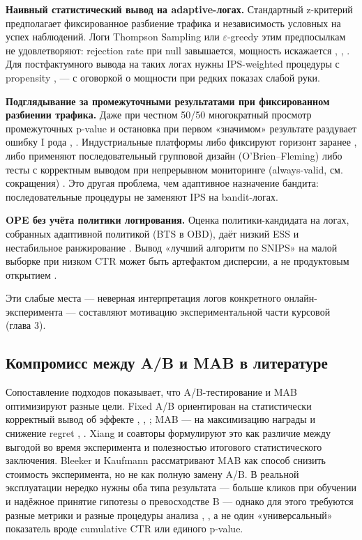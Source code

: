 \textbf{Наивный статистический вывод на adaptive-логах.} Стандартный z-критерий предполагает фиксированное разбиение трафика и независимость условных на успех наблюдений. Логи Thompson Sampling или $\varepsilon$-greedy этим предпосылкам не удовлетворяют: rejection rate при null завышается, мощность искажается \cite{ref19}, \cite{ref20}, \cite{ref21}. Для постфактумного вывода на таких логах нужны IPS-weighted процедуры с propensity \cite{ref6}, \cite{ref24} --- с оговоркой о мощности при редких показах слабой руки.

\textbf{Подглядывание за промежуточными результатами при фиксированном разбиении трафика.} Даже при честном 50/50 многократный просмотр промежуточных p-value и остановка при первом «значимом» результате раздувает ошибку I рода \cite{ref19}, \cite{ref20}. Индустриальные платформы либо фиксируют горизонт заранее \cite{ref5}, либо применяют последовательный групповой дизайн (O'Brien--Fleming) либо тесты с корректным выводом при непрерывном мониторинге (always-valid, см. сокращения) \cite{ref19}. Это другая проблема, чем адаптивное назначение бандита: последовательные процедуры не заменяют IPS на bandit-логах.

\textbf{OPE без учёта политики логирования.} Оценка политики-кандидата на логах, собранных адаптивной политикой (BTS в OBD), даёт низкий ESS и нестабильное ранжирование \cite{ref26}. Вывод «лучший алгоритм по SNIPS» на малой выборке при низком CTR может быть артефактом дисперсии, а не продуктовым открытием \cite{ref24}.

Эти слабые места --- неверная интерпретация логов конкретного онлайн-эксперимента --- составляют мотивацию экспериментальной части курсовой (глава 3).

\subsection{Компромисс между A/B и MAB в литературе}\label{ux43aux43eux43cux43fux440ux43eux43cux438ux441ux441-ux43cux435ux436ux434ux443-ab-ux438-mab-ux432-ux43bux438ux442ux435ux440ux430ux442ux443ux440ux435}

Сопоставление подходов показывает, что A/B-тестирование и MAB оптимизируют разные цели. Fixed A/B ориентирован на статистически корректный вывод об эффекте \cite{ref5}, \cite{ref19}, \cite{ref20}; MAB --- на максимизацию награды и снижение regret \cite{ref12}, \cite{ref13}. Xiang и соавторы \cite{ref21} формулируют это как различие между выгодой во время эксперимента и полезностью итогового статистического заключения. Bleeker и Kaufmann \cite{ref22} рассматривают MAB как способ снизить стоимость эксперимента, но не как полную замену A/B. В реальной эксплуатации нередко нужны оба типа результата --- больше кликов при обучении и надёжное принятие гипотезы о превосходстве B --- однако для этого требуются разные метрики и разные процедуры анализа \cite{ref13}, \cite{ref21}, а не один «универсальный» показатель вроде cumulative CTR или единого p-value.

